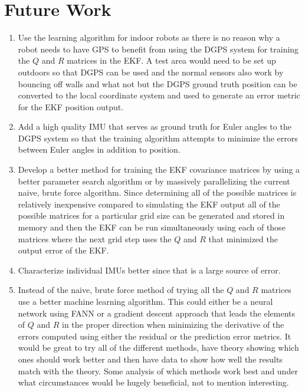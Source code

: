 \chapter{Future Work}
\label{ch:futurework}
\begin{enumerate}
\item Use the learning algorithm for indoor robots as there is no reason why a robot needs to have GPS to benefit from using the DGPS system for training the $Q$ and $R$ matrices in the EKF. A test area would need to be set up outdoors so that DGPS can be used and the normal sensors also work by bouncing off walls and what not but the DGPS ground truth position can be converted to the local coordinate system and used to generate an error metric for the EKF position output.
\item Add a high quality IMU that serves as ground truth for Euler angles to the DGPS system so that the training algorithm attempts to minimize the errors between Euler angles in addition to position.
\item Develop a better method for training the EKF covariance matrices by using a better parameter search algorithm or by massively parallelizing the current naive, brute force algorithm. Since determining all of the possible matrices is relatively inexpensive compared to simulating the EKF output all of the possible matrices for a particular grid size can be generated and stored in memory and then the EKF can be run simultaneously using each of those matrices where the next grid step uses the $Q$ and $R$ that minimized the output error of the EKF.
\item Characterize individual IMUs better since that is a large source of error.
\item Instead of the naive, brute force method of trying all the $Q$ and $R$ matrices use a better machine learning algorithm. This could either be a neural network using FANN or a gradient descent approach that leads the elements of $Q$ and $R$ in the proper direction when minimizing the derivative of the errors computed using either the residual or the prediction error metrics. It would be great to try all of the different methods, have theory showing which ones should work better and then have data to show how well the results match with the theory. Some analysis of which methods work best and under what circumstances would be hugely beneficial, not to mention interesting.
\end{enumerate}
